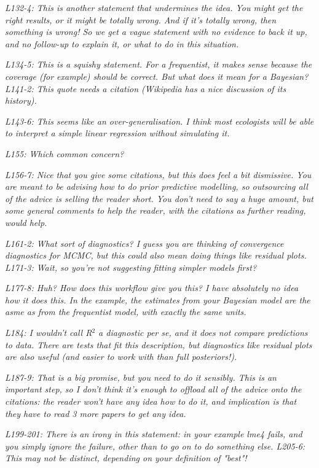\documentclass[11pt,a4paper]{article}
\begin{document}
\emph{L132-4: This is another statement that undermines the idea. You might get the right results, or it might be totally wrong. And if it's totally wrong, then something is wrong! So we get a vague statement with no evidence to back it up, and no follow-up to explain it, or what to do in this situation.}

\emph{L134-5: This is a squishy statement. For a frequentist, it makes sense because the coverage (for example) should be correct. But what does it mean for a Bayesian? L141-2: This quote needs a citation (Wikipedia has a nice discussion of its history).} 

\emph{L143-6: This seems like an over-generalisation. I think most ecologists will be able to interpret a simple linear regression without simulating it.}

\emph{L155: Which common concern?}

\emph{L156-7: Nice that you give some citations, but this does feel a bit dismissive. You are meant to be advising how to do prior predictive modelling, so outsourcing all of the advice is selling the reader short. You don't need to say a huge amount, but some general comments to help the reader, with the citations as further reading, would help.}

\emph{L161-2: What sort of diagnostics? I guess you are thinking of convergence diagnostics for MCMC, but this could also mean doing things like residual plots. L171-3: Wait, so you're not suggesting fitting simpler models first?}

\emph{L177-8: Huh? How does this workflow give you this? I have absolutely no idea how it does this. In the example, the estimates from your Bayesian model are the asme as from the frequentist model, with exactly the same units.}

\emph{L184: I wouldn't call R$^2$ a diagnostic per se, and it does not compare predictions to data. There are tests that fit this description, but diagnostics like residual plots are also useful (and easier to work with than full posteriors!).}

\emph{L187-9: That is a big promise, but you need to do it sensibly. This is an important step, so I don't think it's enough to offload all of the advice onto the citations: the reader won't have any idea how to do it, and implication is that they have to read 3 more papers to get any idea.}

\emph{L199-201: There is an irony in this statement: in your example lme4 fails, and you simply ignore the failure, other than to go on to do something else. L205-6: This may not be distinct, depending on your definition of "best"!}
\end{document}
